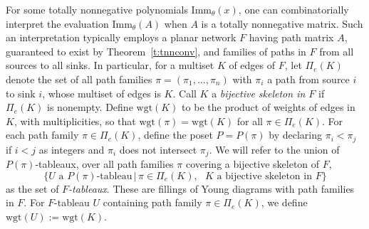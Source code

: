 \documentclass[12pt]{amsart}
\numberwithin{equation}{section}
\newcommand{\imm}[1]{\mathrm{Imm}_{#1}}
\newcommand{\defeq}{:=}
\newcommand{\wgt}{\mathrm{wgt}}
\begin{document}
For some totally nonnegative polynomials $\imm\theta(x)$,
one can combinatorially interpret the
evaluation
$\imm\theta(A)$ when $A$ is a totally nonnegative matrix.
Such an interpretation typically employs
a planar network $F$ having path matrix $A$,
guaranteed to exist by Theorem~\ref{t:tnnconv},
and families of paths in $F$
from all sources
to all sinks.
In particular, for a multiset $K$ of edges of $F$, let
$\Pi_e(K)$ denote
the set of all
path families
$\pi = (\pi_1,\dotsc,\pi_n)$
with $\pi_i$ a path from source $i$ to sink $i$,
whose multiset of edges is $K$.
Call $K$ a {\em bijective skeleton in $F$} if $\Pi_e(K)$ is nonempty.
Define $\wgt(K)$ to be the product of weights of edges in $K$,
with multiplicities, so that $\wgt(\pi) = \wgt(K)$ for all $\pi \in \Pi_e(K)$.
For each path family $\pi \in \Pi_e(K)$, define the poset
$P = P(\pi)$ by declaring $\pi_i < \pi_j$ if
$i < j$ as integers
and
$\pi_i$ does not intersect $\pi_j$.
We will refer to the union of $P(\pi)$-tableaux, over all
path families $\pi$ covering a bijective skeleton of $F$,
\begin{equation}\label{eq:Ftableaux}
  \{ \text{$U$ a $P(\pi)$-tableau} \,|\,
  \pi \in \Pi_e(K), \text{ $K$ a bijective skeleton in $F$} \}
\end{equation}
as the set of {\em $F$-tableaux}.  These are fillings of Young diagrams
with path families in $F$.
For $F$-tableau $U$ containing path family $\pi \in \Pi_e(K)$,
we define $\wgt(U) \defeq \wgt(K)$.
\end{document}
